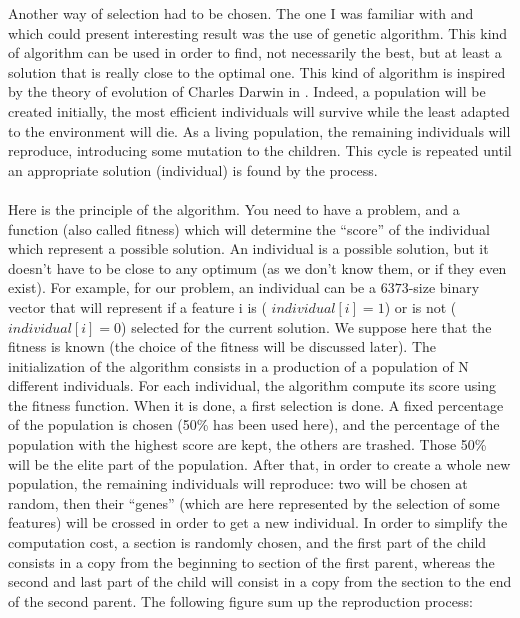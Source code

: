 \documentclass{report}
\begin{document}
	Another way of selection had to be chosen. The one I was familiar with and which could present interesting result was the use of genetic algorithm. This kind of algorithm can be used in order to find, not necessarily the best, but at least a solution that is really close to the optimal one. This kind of algorithm is inspired by the theory of evolution of Charles Darwin in \cite{darwin1859origins}. Indeed, a population will be created initially, the most efficient individuals will survive while the least adapted to the environment will die. As a living population, the remaining individuals will reproduce, introducing some mutation to the children. This cycle is repeated until an appropriate solution (individual) is found by the process.\\\\
	Here is the principle of the algorithm. You need to have a problem, and a function (also called fitness) which will determine the “score” of the individual which represent a possible solution. An individual is a possible solution, but it doesn't have to be close to any optimum (as we don't know them, or if they even exist). For example, for our problem, an individual can be a $6373$-size binary vector that will represent if a feature i is ( $individual[i] = 1$) or is not ($individual[i] = 0$) selected for the current solution. We suppose here that the fitness is known (the choice of the fitness will be discussed later).
	The initialization of the algorithm consists in a production of a population of N different individuals. For each individual, the algorithm compute its score using the fitness function. When it is done, a first selection is done. A fixed percentage of the population is chosen (50\% has been used here), and the percentage of the population with the highest score are kept, the others are trashed. Those 50\% will be the elite part of the population. After that, in order to create a whole new population, the remaining individuals will reproduce: two will be chosen at random, then their “genes” (which are here represented by the selection of some features) will be crossed in order to get a new individual. In order to simplify the computation cost, a section is randomly chosen, and the first part of the child consists in a copy from the beginning to section of the first parent, whereas the second and last part of the child will consist in a copy from the section to the end of the second parent. The following figure sum up the reproduction process:
	
\end{document}
